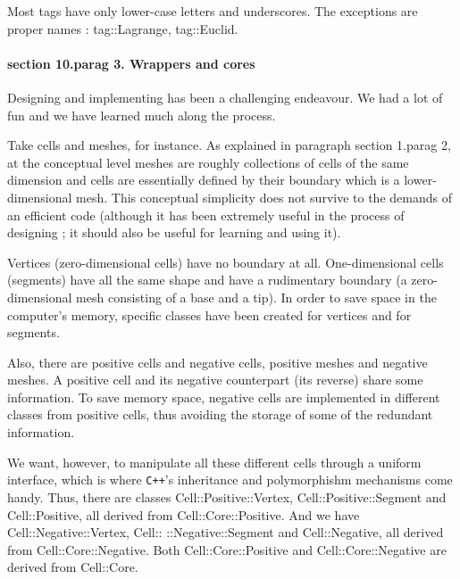 Most tags have only lower-case letters and underscores.
The exceptions are proper names : {\codett tag::Lagrange}, {\codett tag::Euclid}.


\paragraph{\numb section 10.\numb parag 3. Wrappers and cores}

Designing and implementing {\maniFEM} has been a challenging endeavour.
We had a lot of fun and we have learned much along the process.

Take cells and meshes, for instance.
As explained in paragraph \numb section 1.\numb parag 2, at the conceptual level meshes
are roughly collections of cells of the same dimension and cells are essentially
defined by their boundary which is a lower-dimensional mesh.
This conceptual simplicity does not survive to the demands of an efficient code
(although it has been extremely useful in the process of designing \maniFEM;
it should also be useful for learning and using it).

Vertices (zero-dimensional cells) have no boundary at all.
One-dimensional cells (segments) have all the same shape and have a rudimentary boundary
(a zero-dimensional mesh consisting of a {\codett base} and a {\codett tip}).
In order to save space in the computer's memory, specific classes have been created for
vertices and for segments.

Also, there are positive cells and negative cells, positive meshes and negative meshes.
A positive cell and its negative counterpart (its {\codett reverse}) share some information.
To save memory space, negative cells are implemented in different classes from
positive cells, thus avoiding the storage of some of the redundant information.

We want, however, to manipulate all these different cells through a uniform interface,
which is where {\tt C++}'s inheritance and polymorphishm mechanisms come handy.
Thus, there are classes {\codett Cell::Positive::Vertex}, {\codett Cell::Positive::Segment}
and {\codett Cell::Positive}, all derived from {\codett Cell::Core::Positive}.
And we have {\codett Cell::Negative::Vertex}, {\codett Cell:: ::Negative::Segment} and {\codett
Cell::Negative}, all derived from {\codett Cell::Core::Negative}.
Both {\codett Cell::Core::Positive} and {\codett Cell::Core::Negative} are derived from
{\codett Cell::Core}.

